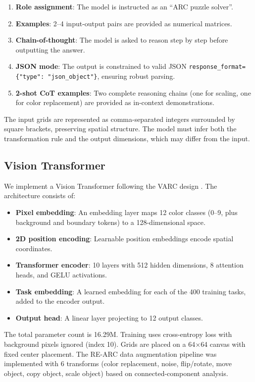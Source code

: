 \documentclass{article}
\begin{document}
\begin{enumerate}
    \item \textbf{Role assignment}: The model is instructed as an ``ARC puzzle solver''.
    \item \textbf{Examples}: 2--4 input-output pairs are provided as numerical matrices.
    \item \textbf{Chain-of-thought}: The model is asked to reason step by step before outputting the answer.
    \item \textbf{JSON mode}: The output is constrained to valid JSON \texttt{response\_format=\{"type": "json\_object"\}}, ensuring robust parsing.
    \item \textbf{2-shot CoT examples}: Two complete reasoning chains (one for scaling, one for color replacement) are provided as in-context demonstrations.
\end{enumerate}

The input grids are represented as comma-separated integers surrounded by square brackets, preserving spatial structure. The model must infer both the transformation rule and the output dimensions, which may differ from the input.

\subsection{Vision Transformer}

We implement a Vision Transformer \cite{dosovitskiy2021image} following the VARC design \cite{arxiv2511.14761}. The architecture consists of:

\begin{itemize}
    \item \textbf{Pixel embedding}: An embedding layer maps 12 color classes (0--9, plus background and boundary tokens) to a 128-dimensional space.
    \item \textbf{2D position encoding}: Learnable position embeddings encode spatial coordinates.
    \item \textbf{Transformer encoder}: 10 layers with 512 hidden dimensions, 8 attention heads, and GELU activations.
    \item \textbf{Task embedding}: A learned embedding for each of the 400 training tasks, added to the encoder output.
    \item \textbf{Output head}: A linear layer projecting to 12 output classes.
\end{itemize}

The total parameter count is 16.29M. Training uses cross-entropy loss with background pixels ignored (index 10). Grids are placed on a 64$\times$64 canvas with fixed center placement. The RE-ARC data augmentation pipeline \cite{arxiv2511.14761} was implemented with 6 transforms (color replacement, noise, flip/rotate, move object, copy object, scale object) based on connected-component analysis.
\end{document}
